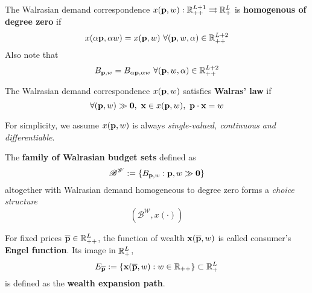 \documentclass{article}
\begin{document}
 			\begin{definition}
 				The Walrasian demand correspondence $x(\textbf{p}, w): \mathbb{R}_{++}^{L+1} \rightrightarrows \mathbb{R}_+^L$ is \textbf{homogenous of degree zero} if 
 				\begin{equation}
 					x(\alpha \ve{p}, \alpha w) = x(\ve{p}, w)\ \forall (\ve{p}, w, \alpha) \in \R_{++}^{L+2}
 				\end{equation}
 				Also note that
 				\begin{equation}
 					B_{\textbf{p}, w} = B_{\alpha \textbf{p}, \alpha w}\ \forall (\textbf{p}, w, \alpha) \in \mathbb{R}_{++}^{L+2}
 				\end{equation}
 			\end{definition}
 			
 			\begin{definition}
 				The Walrasian demand correspondence $x(\textbf{p}, w)$ satisfies \textbf{Walras' law} if
 				\begin{equation}
 					\forall (\textbf{p}, w) \gg \textbf{0},\ \textbf{x} \in x(\textbf{p}, w),\ \textbf{p} \cdot \textbf{x} = w
 				\end{equation}
 			\end{definition}
 			
 			\begin{assumption}
 				For simplicity, we assume $x(\textbf{p}, w)$ is always \emph{single-valued, continuous and differentiable}.
 			\end{assumption}
 			
 			\begin{proposition}
 				The \textbf{family of Walrasian budget sets} defined as
 				\begin{equation}
 					\mathscr{B}^{\mathscr{W}} := \{B_{\textbf{p}, w}: {\textbf{p}, w} \gg \textbf{0}\}
 				\end{equation}
 				altogether with Walrasian demand homogeneous to degree zero forms a \emph{choice structure}
 				\begin{equation}
 					(\mathscr{B}^{\mathscr{W}}, x(\cdot))
 				\end{equation} 
 			\end{proposition}
 		
 			\begin{definition}
 				For fixed prices $\overline{\textbf{p}} \in \mathbb{R}_{++}^L$, the function of wealth $\textbf{x}(\overline{\textbf{p}}, w)$ is called consumer's \textbf{Engel function}. Its image in $\mathbb{R}^L_+$,
 				\begin{equation}
 					E_{\overline{\textbf{p}}} := \{\textbf{x}(\overline{\textbf{p}}, w): w \in \mathbb{R}_{++}\} \subset \mathbb{R}^L_+
 				\end{equation}
 				is defined as the \textbf{wealth expansion path}.
 			\end{definition}
 			
\end{document}
